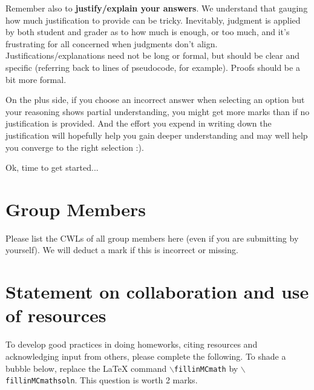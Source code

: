 \documentclass[11pt,fleqn]{exam}
\begin{document}
Remember also  to \textbf{justify/explain  your answers}. We  understand that  gauging how
much  justification to  provide can  be tricky.  Inevitably, judgment  is applied  by both
student and  grader as to how  much is enough, or  too much, and it's  frustrating for all
concerned  when judgments  don't align.  Justifications/explanations need  not be  long or
formal, but  should be  clear and  specific (referring  back to  lines of  pseudocode, for
example). Proofs should be a bit more formal.

On the  plus side, if  you choose an  incorrect answer when  selecting an option  but your
reasoning shows partial  understanding, you might get more marks  than if no justification
is provided. And  the effort you expend  in writing down the  justification will hopefully
help you gain deeper  understanding and may well help you converge  to the right selection
:).

\vspace{.1in}

Ok, time to get started...

\clearpage

\section*{Group Members}

Please list the CWLs of all group members here (even if you are submitting by yourself). We will deduct a mark if this is incorrect or missing.

\section{Statement on collaboration and use of resources}
To develop good practices in doing homeworks,
citing resources and acknowledging input from others, please complete the following. To shade a bubble below, replace the LaTeX command \texttt{$\backslash$fillinMCmath} by \texttt{$\backslash$fillinMCmathsoln}.
This question is worth 2 marks.
\end{document}
